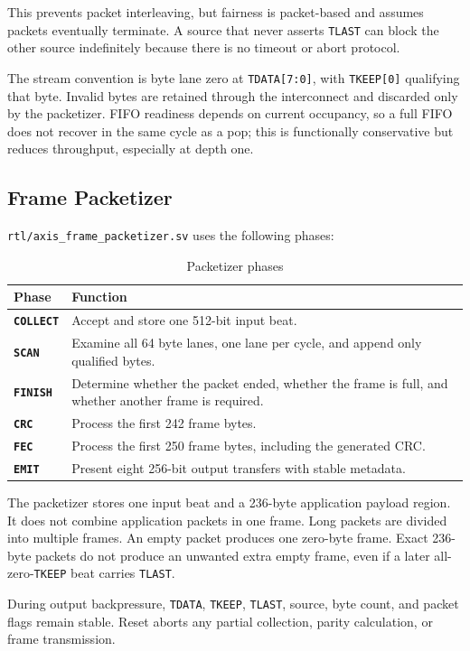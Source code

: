 \documentclass[11pt,a4paper]{article}
\newcommand{\code}[1]{\texttt{#1}}
\begin{document}
This prevents packet interleaving, but fairness is packet-based and assumes packets
eventually terminate. A source that never asserts \code{TLAST} can block the other source
indefinitely because there is no timeout or abort protocol.

The stream convention is byte lane zero at \code{TDATA[7:0]}, with \code{TKEEP[0]}
qualifying that byte. Invalid bytes are retained through the interconnect and discarded
only by the packetizer. FIFO readiness depends on current occupancy, so a full FIFO does
not recover in the same cycle as a pop; this is functionally conservative but reduces
throughput, especially at depth one.

\subsection{Frame Packetizer}
\code{rtl/axis\_frame\_packetizer.sv} uses the following phases:

\begin{table}[H]
\centering
\caption{Packetizer phases}
\begin{tabular}{>{\bfseries}ll}
\toprule
Phase & Function \\
\midrule
\code{COLLECT} & Accept and store one 512-bit input beat. \\
\code{SCAN} & Examine all 64 byte lanes, one lane per cycle, and append only qualified bytes. \\
\code{FINISH} & Determine whether the packet ended, whether the frame is full, and whether another frame is required. \\
\code{CRC} & Process the first 242 frame bytes. \\
\code{FEC} & Process the first 250 frame bytes, including the generated CRC. \\
\code{EMIT} & Present eight 256-bit output transfers with stable metadata. \\
\bottomrule
\end{tabular}
\end{table}

The packetizer stores one input beat and a 236-byte application payload region. It does not
combine application packets in one frame. Long packets are divided into multiple frames. An
empty packet produces one zero-byte frame. Exact 236-byte packets do not produce an
unwanted extra empty frame, even if a later all-zero-\code{TKEEP} beat carries \code{TLAST}.

During output backpressure, \code{TDATA}, \code{TKEEP}, \code{TLAST}, source, byte count,
and packet flags remain stable. Reset aborts any partial collection, parity calculation, or
frame transmission.
\end{document}
